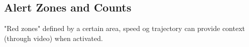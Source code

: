\documentclass[
10pt, %
a4paper, %
oneside, %
headinclude,footinclude, %
] {book}%
\begin{document}
\subsection{Alert Zones and Counts}

"Red zones" defined by a certain area, speed og trajectory can provide context (through video) when activated. 






\end{document}
